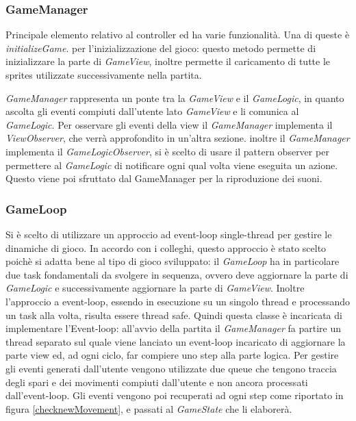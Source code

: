 
\subsubsection{GameManager} Principale elemento relativo al controller ed ha varie funzionalità. Una di queste è \textit{initializeGame}. per l'inizializzazione del gioco: questo metodo permette di inizializzare la parte di \textit{GameView}, inoltre permette il caricamento di tutte le sprites utilizzate successivamente nella partita.
    
\textit{GameManager} rappresenta un ponte tra la \textit{GameView} e il \textit{GameLogic}, in quanto ascolta gli eventi compiuti dall'utente lato \textit{GameView} e li comunica al \textit{GameLogic}. 
    Per osservare gli eventi della view il \textit{GameManager} implementa il \textit{ViewObserver}, che verrà approfondito in un'altra sezione.
    inoltre il \textit{GameManager} implementa il \textit{GameLogicObserver}, si è scelto di usare il pattern observer per permettere al \textit{GameLogic} di notificare ogni qual volta viene eseguita un azione. Questo viene poi sfruttato dal GameManager per la riproduzione dei suoni.
    
    \subsubsection{GameLoop} Si è scelto di utilizzare un approccio ad event-loop single-thread per gestire le dinamiche di gioco. In accordo con i colleghi, questo approccio è stato scelto poichè si adatta bene al tipo di gioco sviluppato: il \textit{GameLoop} ha in particolare due task fondamentali da svolgere in sequenza, ovvero deve aggiornare la parte di \textit{GameLogic} e successivamente aggiornare la parte di \textit{GameView}. Inoltre l'approccio a event-loop, essendo in esecuzione su un singolo thread e processando un task alla volta, risulta essere thread safe.
    Quindi questa classe è incaricata di implementare l'Event-loop: all'avvio della partita il \textit{GameManager} fa partire un thread separato sul quale viene lanciato un event-loop incaricato di aggiornare la parte view ed, ad ogni ciclo, far compiere uno step alla parte logica.
    Per gestire gli eventi generati dall'utente vengono utilizzate due queue che tengono traccia degli spari e dei movimenti compiuti dall'utente e non ancora processati dall'event-loop. Gli eventi vengono poi recuperati ad ogni step come riportato in figura \ref{checknewMovement}, e passati al \textit{GameState} che li elaborerà. 
    
